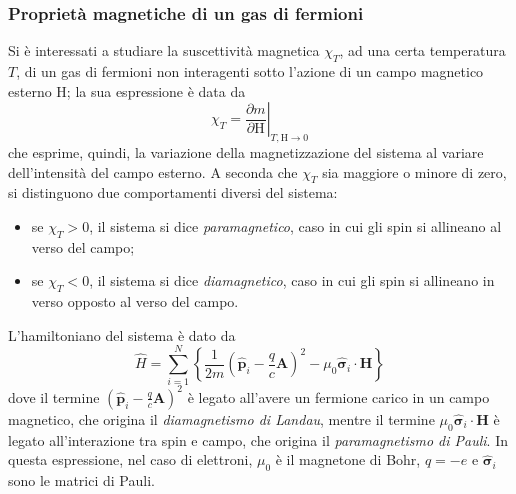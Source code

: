 \documentclass[11pt, a4paper]{scrartcl}
\theoremstyle{style}
\theoremstyle{style1}
\newcommand*\Eval[3]{\left.#1\right\rvert_{#2}^{#3}}
\numberwithin{equation}{subsection}
\begin{document}
\subsubsection{Propriet\`a magnetiche di un gas di fermioni}
Si \`e interessati a studiare la suscettivit\`a magnetica $\chi _T$, ad una certa temperatura $T$, di un gas di fermioni non interagenti sotto l'azione di un campo magnetico esterno $\mathrm{H}$; la sua espressione \`e data da 
\[
	\chi _T = \Eval{\frac{\partial m}{\partial \mathrm{H} } }{T,\mathrm{H} \to 0}{}
\] 
che esprime, quindi, la variazione della magnetizzazione del sistema al variare dell'intensit\`a del campo esterno.
A seconda che $\chi _T$ sia maggiore o minore di zero, si distinguono due comportamenti diversi del sistema:
\begin{itemize}
	\item se $\chi _T > 0$, il sistema si dice \textit{paramagnetico}, caso in cui gli spin si allineano al verso del campo;
	\item se $\chi _T < 0$, il sistema si dice \textit{diamagnetico}, caso in cui gli spin si allineano in verso opposto al verso del campo.
\end{itemize}
L'hamiltoniano del sistema \`e dato da 
\[
\hat{H} = \sum_{i=1}^{N} \left\{ \frac{1}{2m} \left(\hat{\mathbf{p} }_i - \frac{q}{c}\mathbf{A} \right) ^2 - \mu _0 \hat{\pmb{\sigma }} _i \cdot \mathbf{H}  \right\} 
\] 
dove il termine $\left(\hat{\mathbf{p} }_i - \frac{q}{c}\mathbf{A} \right) ^2$ \`e legato all'avere un fermione carico in un campo magnetico, che origina il \textit{diamagnetismo di Landau}, mentre il termine $\mu _0 \hat{\pmb{\sigma }} _i \cdot \mathbf{H} $ \`e legato all'interazione tra spin e campo, che origina il \textit{paramagnetismo di Pauli}.
In questa espressione, nel caso di elettroni, $\mu _0$ \`e il magnetone di Bohr, $q = -e$ e $\hat{\pmb{\sigma } }_i$ sono le matrici di Pauli.
\end{document}

